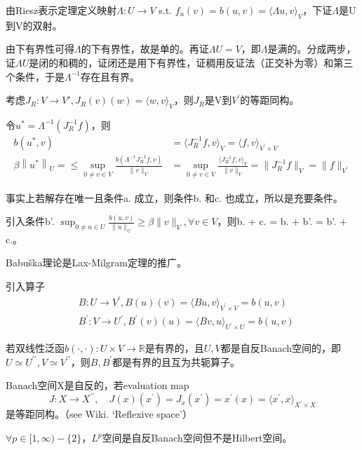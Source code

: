 \begin{pf}
  由Riesz表示定理定义映射$\Lambda: U \to V$ s.t. $f_u(v) = b(u, v) = \langle \Lambda u, v \rangle_V$，下证$\Lambda$是U到V的双射。

  由下有界性可得$\Lambda$的下有界性，故是单的。再证$\Lambda U = V$，即$\Lambda$是满的。分成两步，证$\Lambda U$是闭的和稠的，证闭还是用下有界性，证稠用反证法（正交补为零）和第三个条件，于是$\Lambda^{-1}$存在且有界。

  考虑$J_R: V \to V', J_R(v)(w) = \langle w, v \rangle_V$，则$J_R$是V到$V^{\prime}$的等距同构。

  令$u^\ast = \Lambda^{-1} (J_R^{-1}f)$，则
  \[
    \begin{aligned}
      b\left(u^{\ast}, v\right) &= \langle J_R^{-1}f, v \rangle_V = \langle f, v\rangle_{V^{\prime} \times V}\\
      \beta \left\|u^{\ast}\right\|_{U} = \le \sup_{0 \neq v \in V} \frac{b(\Lambda^{-1} J_R^{-1}f, v)}{\|v\|_{V}} &= \sup_{0 \neq v \in V} \frac{\langle J_R^{-1}f, v \rangle_V}{\|v\|_{V}} = \|J_R^{-1}f\|_V = \|f\|_{V^\prime}
    \end{aligned}
  \]
\end{pf}

事实上若解存在唯一且条件a. 成立，则条件b. 和c. 也成立，所以是充要条件。

引入条件b'. $\sup_{0 \neq u \in U} \frac{b(u, v)}{\|u\|_{U}} \geq \beta\|v\|_{V}, \forall v \in V$，则b. + c. = b. + b'. = b'. + c.。

Babuška理论是Lax-Milgram定理的推广。

引入算子
\[
  \begin{aligned}
    &B: U \to V^\prime, B(u)(v) = \langle Bu, v \rangle_{V^\prime \times V} = b(u, v)\\
    &B^\prime: V \to U^\prime, B^\prime(v)(u) = \langle Bv, u \rangle_{U^\prime \times U} = b(u, v)
  \end{aligned}
\]

若双线性泛函$b(\cdot, \cdot): U \times V \to \mathbb{R}$是有界的，且$U, V$都是自反Banach空间的，即$U \simeq U^{\prime \prime}, V \simeq V^{\prime \prime}$，则$B, B^\prime$都是有界的且互为共轭算子。

Banach空间X是自反的，若evaluation map
\[
  J: X \to X^{\prime \prime},\quad J(x)(x^\prime) = J_x(x^\prime) = x^\prime(x) = \langle x^\prime, x \rangle_{X^\prime \times X}
\]
是等距同构。（see Wiki. `Reflexive space'）

$\forall p \in [1, \infty) - \{2\}$，$L^p$空间是自反Banach空间但不是Hilbert空间。

